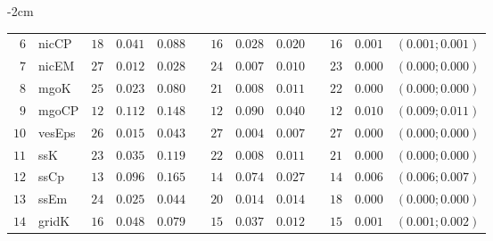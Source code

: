 \begin{table*}[!htbp]
\begin{adjustwidth*}{}{-2cm}
\begin{tabular}{@{}rlrrrrrrrrrcc@{}}
\footnotesize{$6 $} & \footnotesize{nicCP    } & \footnotesize{$18$} & \footnotesize{$0.041$} & \footnotesize{$0.088$} && \footnotesize{$16$} & \footnotesize{$0.028$} & \footnotesize{$0.020$} && \footnotesize{$16$} & \footnotesize{$0.001$} & \footnotesize{$(0.001;0.001)$} \\
\footnotesize{$7 $} & \footnotesize{nicEM    } & \footnotesize{$27$} & \footnotesize{$0.012$} & \footnotesize{$0.028$} && \footnotesize{$24$} & \footnotesize{$0.007$} & \footnotesize{$0.010$} && \footnotesize{$23$} & \footnotesize{$0.000$} & \footnotesize{$(0.000;0.000)$} \\
\footnotesize{$8 $} & \footnotesize{mgoK     } & \footnotesize{$25$} & \footnotesize{$0.023$} & \footnotesize{$0.080$} && \footnotesize{$21$} & \footnotesize{$0.008$} & \footnotesize{$0.011$} && \footnotesize{$22$} & \footnotesize{$0.000$} & \footnotesize{$(0.000;0.000)$} \\
\footnotesize{$9 $} & \footnotesize{mgoCP    } & \footnotesize{$12$} & \footnotesize{$0.112$} & \footnotesize{$0.148$} && \footnotesize{$12$} & \footnotesize{$0.090$} & \footnotesize{$0.040$} && \footnotesize{$12$} & \footnotesize{$0.010$} & \footnotesize{$(0.009;0.011)$} \\
\footnotesize{$10$} & \footnotesize{vesEps   } & \footnotesize{$26$} & \footnotesize{$0.015$} & \footnotesize{$0.043$} && \footnotesize{$27$} & \footnotesize{$0.004$} & \footnotesize{$0.007$} && \footnotesize{$27$} & \footnotesize{$0.000$} & \footnotesize{$(0.000;0.000)$} \\
\footnotesize{$11$} & \footnotesize{ssK      } & \footnotesize{$23$} & \footnotesize{$0.035$} & \footnotesize{$0.119$} && \footnotesize{$22$} & \footnotesize{$0.008$} & \footnotesize{$0.011$} && \footnotesize{$21$} & \footnotesize{$0.000$} & \footnotesize{$(0.000;0.000)$} \\
\footnotesize{$12$} & \footnotesize{ssCp     } & \footnotesize{$13$} & \footnotesize{$0.096$} & \footnotesize{$0.165$} && \footnotesize{$14$} & \footnotesize{$0.074$} & \footnotesize{$0.027$} && \footnotesize{$14$} & \footnotesize{$0.006$} & \footnotesize{$(0.006;0.007)$} \\
\footnotesize{$13$} & \footnotesize{ssEm     } & \footnotesize{$24$} & \footnotesize{$0.025$} & \footnotesize{$0.044$} && \footnotesize{$20$} & \footnotesize{$0.014$} & \footnotesize{$0.014$} && \footnotesize{$18$} & \footnotesize{$0.000$} & \footnotesize{$(0.000;0.000)$} \\
\footnotesize{$14$} & \footnotesize{gridK    } & \footnotesize{$16$} & \footnotesize{$0.048$} & \footnotesize{$0.079$} && \footnotesize{$15$} & \footnotesize{$0.037$} & \footnotesize{$0.012$} && \footnotesize{$15$} & \footnotesize{$0.001$} & \footnotesize{$(0.001;0.002)$} \\

\end{tabular}
\end{adjustwidth*}
\end{table*}

